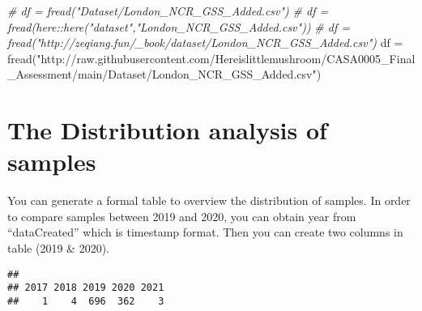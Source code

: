 \documentclass[
]{book}
\newenvironment{Shaded}{\begin{snugshade}}{\end{snugshade}}
\newcommand{\CommentTok}[1]{\textcolor[rgb]{0.56,0.35,0.01}{\textit{#1}}}
\newcommand{\DecValTok}[1]{\textcolor[rgb]{0.00,0.00,0.81}{#1}}
\newcommand{\FunctionTok}[1]{\textcolor[rgb]{0.00,0.00,0.00}{#1}}
\newcommand{\NormalTok}[1]{#1}
\newcommand{\OtherTok}[1]{\textcolor[rgb]{0.56,0.35,0.01}{#1}}
\newcommand{\SpecialCharTok}[1]{\textcolor[rgb]{0.00,0.00,0.00}{#1}}
\newcommand{\StringTok}[1]{\textcolor[rgb]{0.31,0.60,0.02}{#1}}
\begin{document}
\begin{Shaded}
\begin{Highlighting}[]
\CommentTok{\# df = fread("Dataset/London\_NCR\_GSS\_Added.csv")}
\CommentTok{\# df = fread(here::here("dataset","London\_NCR\_GSS\_Added.csv"))}
\CommentTok{\# df = fread("http://zeqiang.fun/\_book/dataset/London\_NCR\_GSS\_Added.csv")}
\NormalTok{ df }\OtherTok{=} \FunctionTok{fread}\NormalTok{(}\StringTok{"http://raw.githubusercontent.com/Hereislittlemushroom/CASA0005\_Final\_Assessment/main/Dataset/London\_NCR\_GSS\_Added.csv"}\NormalTok{)}
\end{Highlighting}
\end{Shaded}

\hypertarget{the-distribution-analysis-of-samples}{%
\chapter{The Distribution analysis of samples}\label{the-distribution-analysis-of-samples}}

You can generate a formal table to overview the distribution of samples. In order to compare samples between 2019 and 2020, you can obtain year from ``dataCreated'' which is timestamp format. Then you can create two columns in table (2019 \& 2020).

\begin{Shaded}
\end{Shaded}

\begin{verbatim}
## 
## 2017 2018 2019 2020 2021 
##    1    4  696  362    3
\end{verbatim}

\begin{Shaded}
\end{Shaded}
\end{document}
